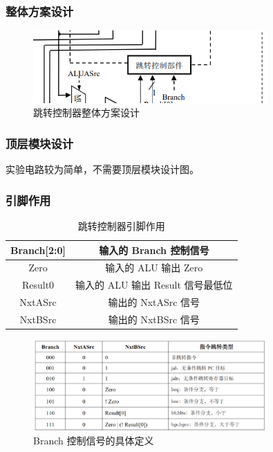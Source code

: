 \documentclass{article}
\begin{document}
    \subsubsection{整体方案设计}

    \begin{figure}[H]
    \centering
    \includegraphics[width=0.8\textwidth]{5.1.png}
    \caption{跳转控制器整体方案设计}
    \end{figure}

    \subsubsection{顶层模块设计}
    实验电路较为简单，不需要顶层模块设计图。

    \subsubsection{引脚作用}
    \begin{table}[H]
    \centering
    \begin{tabular}{|c|c|}
        \hline
        Branch[2:0]     & 输入的 Branch 控制信号 \\ \hline
        Zero   & 输入的 ALU 输出 Zero \\ \hline
        Result0 & 输入的 ALU 输出 Result 信号最低位 \\ \hline
        NxtASrc  & 输出的 NxtASrc 信号 \\ \hline
        NxtBSrc & 输出的 NxtBSrc 信号 \\ \hline
    \end{tabular}
    \caption{跳转控制器引脚作用}
    \end{table}

    \begin{figure}[H]
        \centering
        \includegraphics[width=0.8\textwidth]{5.2.png}
        \caption{Branch 控制信号的具体定义}
    \end{figure}
\end{document}
